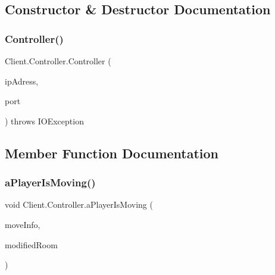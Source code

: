 \subsection{Constructor \& Destructor Documentation}
\mbox{\label{classClient_1_1Controller_a65c1ddbad549d42f6ba2f6b3399298f3}} 
\subsubsection{\texorpdfstring{Controller()}{Controller()}}
{\footnotesize\ttfamily Client.\+Controller.\+Controller (\begin{DoxyParamCaption}\item[{String}]{ip\+Adress,  }\item[{int}]{port }\end{DoxyParamCaption}) throws I\+O\+Exception\hspace{0.3cm}{\ttfamily [inline]}}



\subsection{Member Function Documentation}
\mbox{\label{classClient_1_1Controller_a880e33fad7f0f2ad543ead04bcd6d2b7}} 
\subsubsection{\texorpdfstring{a\+Player\+Is\+Moving()}{aPlayerIsMoving()}}
{\footnotesize\ttfamily void Client.\+Controller.\+a\+Player\+Is\+Moving (\begin{DoxyParamCaption}\item[{\mbox{\hyperlink{classCommon_1_1RoomMovingClient}{Room\+Moving\+Client}}}]{move\+Info,  }\item[{\mbox{\hyperlink{classCommon_1_1RoomInfo}{Room\+Info}}}]{modified\+Room }\end{DoxyParamCaption})\hspace{0.3cm}{\ttfamily [inline]}}

